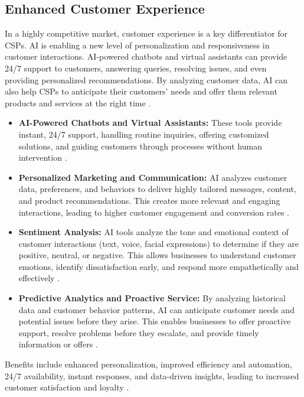 \subsection{Enhanced Customer Experience}
In a highly competitive market, customer experience is a key differentiator for CSPs. AI is enabling a new level of personalization and responsiveness in customer interactions. AI-powered chatbots and virtual assistants can provide 24/7 support to customers, answering queries, resolving issues, and even providing personalized recommendations. By analyzing customer data, AI can also help CSPs to anticipate their customers' needs and offer them relevant products and services at the right time \cite{dimcheva2024opportunities}.
\begin{itemize}
    \item \textbf{AI-Powered Chatbots and Virtual Assistants:} These tools provide instant, 24/7 support, handling routine inquiries, offering customized solutions, and guiding customers through processes without human intervention \cite{NewHorizons_CustomerExp, Acrobits_CustomerExp}.
    \item \textbf{Personalized Marketing and Communication:} AI analyzes customer data, preferences, and behaviors to deliver highly tailored messages, content, and product recommendations. This creates more relevant and engaging interactions, leading to higher customer engagement and conversion rates \cite{Zendesk_CustomerExp, Net2Phone_CustomerExp}.
    \item \textbf{Sentiment Analysis:} AI tools analyze the tone and emotional context of customer interactions (text, voice, facial expressions) to determine if they are positive, neutral, or negative. This allows businesses to understand customer emotions, identify dissatisfaction early, and respond more empathetically and effectively \cite{Elfsight_CustomerExp, ControlHippo_CustomerExp}.
    \item \textbf{Predictive Analytics and Proactive Service:} By analyzing historical data and customer behavior patterns, AI can anticipate customer needs and potential issues before they arise. This enables businesses to offer proactive support, resolve problems before they escalate, and provide timely information or offers \cite{Nice_CustomerExp, Aivo_CustomerExp}.
\end{itemize}
Benefits include enhanced personalization, improved efficiency and automation, 24/7 availability, instant responses, and data-driven insights, leading to increased customer satisfaction and loyalty \cite{BoostAI_CustomerExp, Podium_CustomerExp}.

